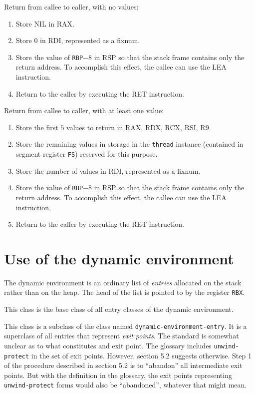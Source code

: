 Return from callee to caller, with no values:

\begin{enumerate}
\item Store NIL in RAX.
\item Store $0$ in RDI, represented as a fixnum.
\item Store the value of \texttt{RBP}$ - 8$ in RSP so that the stack frame
  contains only the return address.  To accomplish this effect, the
  callee can use the LEA instruction.
\item Return to the caller by executing the RET instruction.
\end{enumerate}

Return from callee to caller, with at least one value:

\begin{enumerate}
\item Store the first $5$ values to return in RAX, RDX, RCX, RSI, R9.
\item Store the remaining values in storage in the \texttt{thread}
  instance (contained in segment register \texttt{FS}) reserved for
  this purpose.
\item Store the number of values in RDI, represented as a fixnum.
\item Store the value of \texttt{RBP}$ - 8$ in RSP so that the stack frame
  contains only the return address.  To accomplish this effect, the
  callee can use the LEA instruction.
\item Return to the caller by executing the RET instruction.
\end{enumerate}

\section{Use of the dynamic environment}

The dynamic environment is an ordinary list of \emph{entries}
allocated on the stack rather than on the heap.  The head of the list
is pointed to by the register \texttt{RBX}.


This class is the base class of all entry classes of the dynamic
environment.


This class is a subclass of the class named
\texttt{dynamic-environment-entry}.  It is a superclass of all entries
that represent \emph{exit points}.  The \commonlisp{} standard is
somewhat unclear as to what constitutes and exit point.  The glossary
includes \texttt{unwind-protect} in the set of exit points.  However,
section 5.2 suggests otherwise.  Step 1 of the procedure described in
section 5.2 is to ``abandon'' all intermediate exit points.  But with
the definition in the glossary, the exit points representing
\texttt{unwind-protect} forms would also be ``abandoned'', whatever
that might mean.

